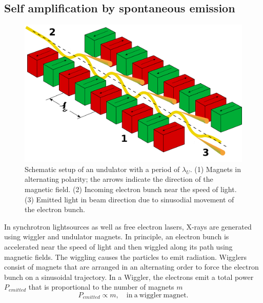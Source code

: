 \subsection{Self amplification by spontaneous emission}\label{sec:sase}
\begin{figure}[t]
	\centering
		\includegraphics[width=1.00\textwidth]{images/Undulator.png}
	\caption[Schematic setup of an undulator.]{Schematic setup of an undulator with a period of $\lambda_{U}$. (1) Magnets in alternating polarity; the arrows indicate the direction of the magnetic field. (2) Incoming electron bunch near the speed of light. (3) Emitted light in beam direction due to sinusodial movement of the electron bunch. \cite{holst-2005-wiki}}
	\label{fig:undulator}
\end{figure}
In synchrotron lightsources as well as free electron lasers, X-rays are generated using wiggler and undulator magnets. In principle, an electron bunch is accelerated near the speed of light and then wiggled along its path using magnetic fields. The wiggling causes the particles to emit radiation. Wigglers consist of magnets that are arranged in an alternating order to force the electron bunch on a sinusoidal trajectory. In a Wiggler, the electrons emit a total power $P_{emitted}$ that is proportional to the number of magnets $m$ \citep{Brown-1983-NIMPR}
\begin{equation}
P_{emitted} \propto m,\quad \mathrm{in\ a\ wiggler\ magnet}.
\end{equation}
